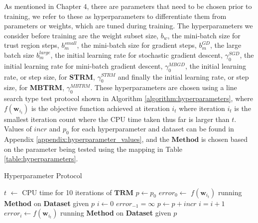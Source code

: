 \documentclass[letterpaper,12pt,titlepage,oneside,final]{book}
\begin{document}
	As mentioned in Chapter 4, there are parameters that need to be chosen prior to training, we refer to these as hyperparameters to differentiate them from parameters or weights, which are tuned during training. The hyperparameters we consider before training are the weight subset size, $b_{w}$, the mini-batch size for trust region steps, $b_{m}^{small}$, the mini-batch size for gradient steps, $b_{m}^{GD}$, the large batch size $b_{m}^{large}$, the initial learning rate for stochastic gradient descent, $\gamma^{SGD}_{0}$, the initial learning rate for mini-batch gradient descent, $\gamma^{MBGD}_{0}$, the initial learning rate, or step size, for \textbf{STRM}, $\gamma^{STRM}_{0}$ and finally the initial learning rate, or step size, for \textbf{MBTRM}, $\gamma^{MBTRM}_{0}$. These hyperparameters are chosen using a line search type test protocol shown in Algorithm \ref{algorithm:hyperparameters}, where $f(\mathbf{w}_{i_{t}})$ is the objective function achieved at iteration $i_{t}$ where iteration $i_{t}$ is the smallest iteration count where the CPU time taken thus far is larger than $t$. Values of $incr$ and $p_{0}$ for each hyperparameter and dataset can be found in Appendix \ref{appendix:hyperparameter_values}, and the $\mathbf{Method}$ is chosen based on the parameter being tested using the mapping in Table \ref{table:hyperparameters}.
	
	\begin{algorithm}
		\caption{Hyperparameter Protocol}\label{algorithm:hyperparameters}
		\begin{algorithmic}[1]
			\State $t$ $\gets$ CPU time for 10 iterations of $\mathbf{TRM}$
			\State $p \gets p_{0}$
			\State $error_{0} \gets$ $f(\mathbf{w}_{i_{t}})$ running \textbf{Method} on \textbf{Dataset} given $p$
			\State $i \gets 0$
			\State $error_{-1} = \infty$
			\State $p \gets p + incr$
			\State $i = i + 1$
			\State $error_{i} \gets f(\mathbf{w}_{i_{t}})$ running \textbf{Method} on \textbf{Dataset} given $p$
			\EndWhile
			\EndProcedure
		\end{algorithmic}
	\end{algorithm}
	
\end{document}
